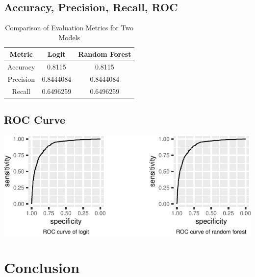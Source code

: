 \documentclass{article}
\begin{document}
\hypertarget{accuracy-precision-recall-roc}{%
\subsection{Accuracy, Precision, Recall,
ROC}\label{accuracy-precision-recall-roc}}

\begin{table}[h]
\centering
\begin{tabular}{|c|c|c|}
\hline
\textbf{Metric} & \textbf{Logit} & \textbf{Random Forest} \\
\hline
Accuracy & 0.8115 & 0.8115 \\
Precision & 0.8444084 & 0.8444084 \\
Recall & 0.6496259 & 0.6496259 \\
\hline
\end{tabular}
\caption{Comparison of Evaluation Metrics for Two Models}
\label{tab:comparison}
\end{table}

\hypertarget{roc-curve}{%
\subsection{ROC Curve}\label{roc-curve}}

\includegraphics{report_files/figure-latex/unnamed-chunk-18-1.pdf}

\hypertarget{conclusion}{%
\section{Conclusion}\label{conclusion}}



\end{document}
